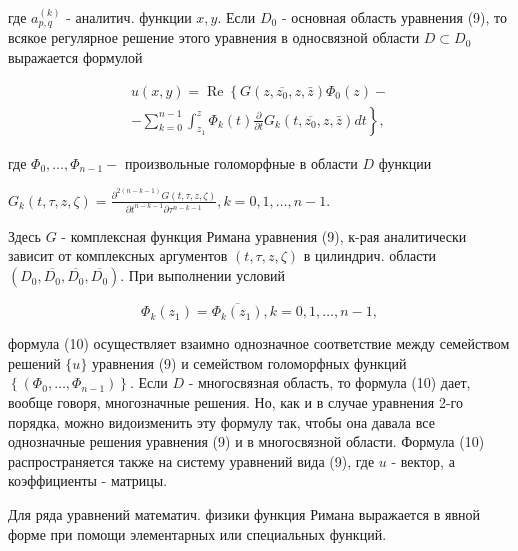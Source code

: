\documentclass[10pt]{article}
\begin{document}
где $a_{p, q}^{(k)}$ - аналитич. функции $x, y$. Если $D_{0}$ - основная область уравнения (9), то всякое регулярное решение этого уравнения в односвязной области $D \subset D_{0}$ выражается формулой



\[

\begin{gathered}

u(x, y)=\operatorname{Re}\left\{G\left(z, \overline{z_{0}}, z, \bar{z}\right) \Phi_{0}(z)-\right. \\

\left.-\sum_{k=0}^{n-1} \int_{z_{1}}^{z} \Phi_{k}(t) \frac{\partial}{\partial t} G_{k}\left(t, \overline{z_{0}}, z, \bar{z}\right) d t\right\},

\end{gathered}

\]



где $\Phi_{0}, \ldots, \Phi_{n-1}-$ произвольные голоморфные в области $D$ функции



$G_{k}(t, \tau, z, \zeta)=\frac{\partial^{2(n-k-1)} G(t, \tau, z, \zeta)}{\partial t^{n-k-1} \partial \tau^{n-k-1}}, k=0,1, \ldots, n-1$.



Здесь $G$ - комплексная функция Римана уравнения (9), к-рая аналитически зависит от комплексных аргументов $(t, \tau, z, \zeta)$ в цилиндрич. области $\left(D_{0}, \overline{D_{0}}, \overline{D_{0}}, \overline{D_{0}}\right)$. При выполнении условий



\[

\Phi_{k}\left(z_{1}\right)=\overline{\Phi_{k}\left(z_{1}\right)}, k=0,1, \ldots, n-1,

\]



формула (10) осуществляет взаимно однозначное соответствие между семейством решений $\{u\}$ уравнения (9) и семейством голоморфных функций $\left\{\left(\Phi_{0}, \ldots, \Phi_{n-1}\right)\right\}$. Если $D$ - многосвязная область, то формула (10) дает, вообще говоря, многозначные решения. Но, как и в случае уравнения 2-го порядка, можно видоизменить эту формулу так, чтобы она давала все однозначные решения уравнения (9) и в многосвязной области. Формула (10) распространяется также на систему уравнений вида (9), где $u$ - вектор, а коэффициенты - матрицы.



Для ряда уравнений математич. физики функция Римана выражается в явной форме при помощи элементарных или специальных функций.
\end{document}
